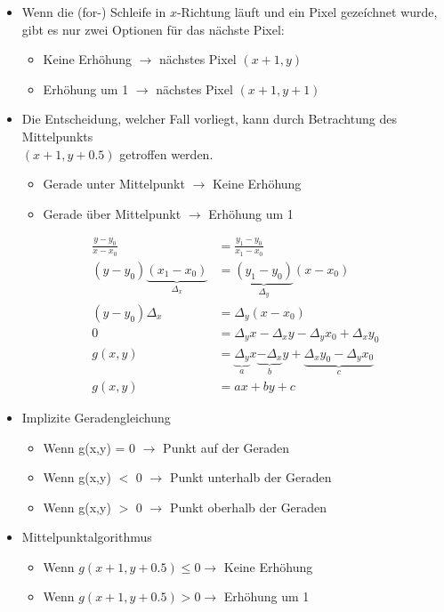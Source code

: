 \documentclass{scrartcl}
\begin{document}
\begin{itemize}
	\item Wenn die (for-) Schleife in $x$-Richtung läuft und ein Pixel gezeíchnet wurde, gibt es nur zwei Optionen für das nächste Pixel:
	\begin{itemize}
		\item Keine Erhöhung $\rightarrow$ nächstes Pixel $(x + 1, y)$
		\item Erhöhung um 1 $\rightarrow$ nächstes Pixel $(x + 1, y + 1)$
	\end{itemize}
	\item Die Entscheidung, welcher Fall vorliegt, kann durch Betrachtung des Mittelpunkts \\
$(x + 1, y + 0.5)$ getroffen werden.
	\begin{itemize}
		\item Gerade unter Mittelpunkt $\rightarrow$ Keine Erhöhung
		\item Gerade über Mittelpunkt $\rightarrow$ Erhöhung um 1
	\end{itemize}
	\begin{equation}
		\begin{split}
			\frac{y - y_0}{x - x_0} &= \frac{y_1 - y_0}{x_1 - x_0} \\
	(y - y_0) \underbrace{(x_1 - x_0)}_{\Delta_x} &= \underbrace{(y_1 - y_0)}_{\Delta_y} (x - x_0) \\
			(y - y_0) \Delta_x &= \Delta_y (x - x_0) \\
			0 &= \Delta_y x - \Delta_x y - \Delta_y x_0 + \Delta_x y_0 \\
			g(x,y) &= \underbrace{\Delta_y}_a x \underbrace{-\Delta_x}_b y + \underbrace{\Delta_x y_0 - \Delta_y x_0}_c \\
			g(x,y) &= ax + by + c
		\end{split}
	\end{equation}
	\item Implizite Geradengleichung
	\begin{itemize}
		\item Wenn g(x,y) = 0 $\rightarrow$ Punkt auf der Geraden
		\item Wenn g(x,y) $<$ 0 $\rightarrow$ Punkt unterhalb der Geraden
		\item Wenn g(x,y) $>$ 0 $\rightarrow$ Punkt oberhalb der Geraden
	\end{itemize}
	\item Mittelpunktalgorithmus
	\begin{itemize}
		\item Wenn $g(x + 1, y + 0.5) \leq 0 \rightarrow$ Keine Erhöhung
		\item Wenn $g(x + 1, y + 0.5) > 0 \rightarrow$ Erhöhung um 1
	\end{itemize}
\end{itemize}
\end{document}

